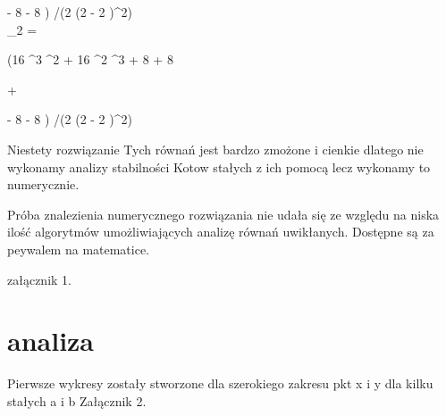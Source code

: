 \documentclass{article}
\begin{document}
        \vspace{0.5cm}
        - 8 \alpha
        - 8 \beta
    )
    /(2 (2 - 2 )^2)
    $$

    $$
    \lambda_2 =

    (16 \alpha^3 \beta^2
    + 16 \alpha^2 \beta^3
    + 8 \alpha {}
    + 8 \beta {}

    \vspace{0.5cm}
    + 

    \vspace{0.5cm}
    - 8 \alpha
    - 8 \beta
    )
    /(2 (2 - 2 )^2)
    $$


    Niestety rozwiązanie Tych równań jest bardzo zmożone i cienkie dlatego nie wykonamy analizy stabilności Kotow stałych z ich pomocą lecz wykonamy to numerycznie.

    Próba znalezienia numerycznego rozwiązania nie udała się ze względu na niska ilość algorytmów umożliwiających analizę równań uwikłanych. Dostępne są za peywalem na matematice.

    załącznik 1.


\newpage

    \section{analiza}
        Pierwsze wykresy zostały stworzone dla szerokiego zakresu pkt x i y dla kilku stałych a i b
        Załącznik 2.
\end{document}
